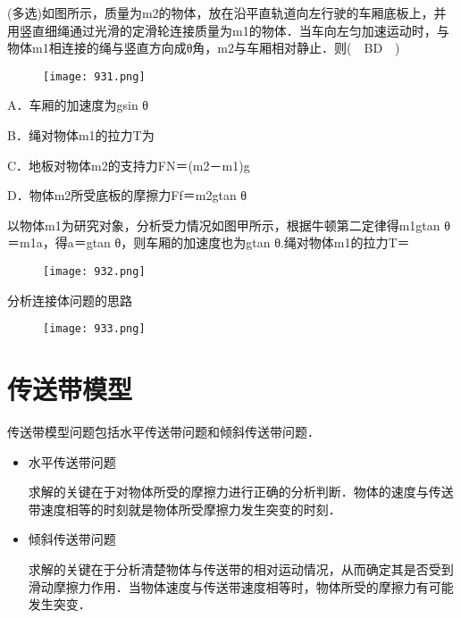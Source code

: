\documentclass[cn,11pt]{elegantbook}
\begin{document}
\begin{example}
   (多选)如图所示，质量为m2的物体，放在沿平直轨道向左行驶的车厢底板上，并用竖直细绳通过光滑的定滑轮连接质量为m1的物体．当车向左匀加速运动时，与物体m1相连接的绳与竖直方向成θ角，m2与车厢相对静止．则(　BD　)

   \begin{figure}[htbp]
      \centering
      \texttt{[image: 931.png]}
   \end{figure}

   A．车厢的加速度为gsin θ

   B．绳对物体m1的拉力T为   
   
   C．地板对物体m2的支持力FN＝(m2－m1)g

   D．物体m2所受底板的摩擦力Ff＝m2gtan θ
   
   \begin{solution}
      以物体m1为研究对象，分析受力情况如图甲所示，根据牛顿第二定律得m1gtan θ＝m1a，得a＝gtan θ，则车厢的加速度也为gtan θ.绳对物体m1的拉力T＝
      
   \begin{figure}[htbp]
      \centering
      \texttt{[image: 932.png]}
   \end{figure}


   \end{solution}
\end{example}

\begin{note}
   分析连接体问题的思路
   \begin{figure}[htbp]
      \centering
      \texttt{[image: 933.png]}
   \end{figure}

   
\end{note}


\section{传送带模型}
传送带模型问题包括水平传送带问题和倾斜传送带问题．
\begin{itemize}
   \item 水平传送带问题
   
   求解的关键在于对物体所受的摩擦力进行正确的分析判断．物体的速度与传送带速度相等的时刻就是物体所受摩擦力发生突变的时刻．
   \item 倾斜传送带问题
   
   求解的关键在于分析清楚物体与传送带的相对运动情况，从而确定其是否受到滑动摩擦力作用．当物体速度与传送带速度相等时，物体所受的摩擦力有可能发生突变．
\end{itemize}
\end{document}
